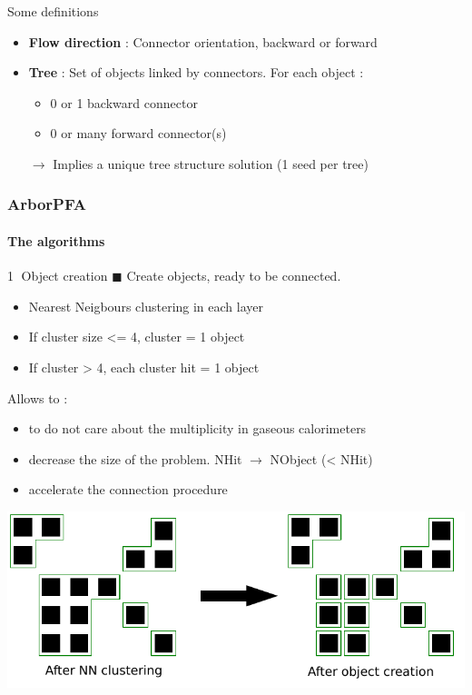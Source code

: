 \documentclass[8pt]{beamer}
\begin{document}
\begin{frame}
\begin{block}{Some definitions}
\begin{itemize}
        \item \textbf{Flow direction} : Connector orientation, backward or forward
        \item \textbf{Tree} : Set of objects linked by connectors. For each object :
        \begin{itemize}
          \item 0 or 1 backward connector
          \item 0 or many forward connector(s)
        \end{itemize}
        $\rightarrow$ Implies a unique tree structure solution (1 seed per tree)
      \end{itemize}
    \end{block}
  \end{frame}
  
  
  \begin{frame}
  \frametitle{ArborPFA}
  \framesubtitle{The algorithms}
      \begin{block}{\textcircled{{\small 1}} Object creation}
        $\blacksquare$ Create objects, ready to be connected.
        \begin{itemize}
          \item Nearest Neigbours clustering in each layer
          \item If cluster size <= 4, cluster = 1 object
          \item If cluster > 4, each cluster hit = 1 object
        \end{itemize}
        Allows to :
        \begin{itemize}
          \item to do not care about the multiplicity in gaseous calorimeters
          \item decrease the size of the problem. NHit $\rightarrow$ NObject (< NHit)
          \item accelerate the connection procedure
        \end{itemize}
      \end{block}
      \begin{center}
      \includegraphics[width=0.7\linewidth]{ObjectCreation.pdf}
      \end{center}

  \end{frame}
  
\end{document}
